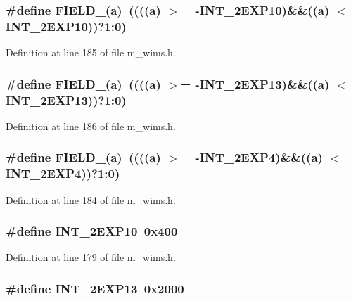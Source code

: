 \subsubsection{\setlength{\rightskip}{0pt plus 5cm}\#define FIELD\_(a)~((((a) $>$= -INT\_\-2EXP10)\&\&((a) $<$ INT\_\-2EXP10))?1:0)}\label{m__wims_8h_3ca7e17ecf6f5e2ca849db42c01b2fa6}




Definition at line 185 of file m\_\-wims.h.
\subsubsection{\setlength{\rightskip}{0pt plus 5cm}\#define FIELD\_(a)~((((a) $>$= -INT\_\-2EXP13)\&\&((a) $<$ INT\_\-2EXP13))?1:0)}\label{m__wims_8h_cc6a0eb7724b0802cbd69ae9acf6082b}




Definition at line 186 of file m\_\-wims.h.
\subsubsection{\setlength{\rightskip}{0pt plus 5cm}\#define FIELD\_(a)~((((a) $>$= -INT\_\-2EXP4)\&\&((a) $<$ INT\_\-2EXP4))?1:0)}\label{m__wims_8h_fccd4f0351ce74077ec3a4453fc78a78}




Definition at line 184 of file m\_\-wims.h.
\subsubsection{\setlength{\rightskip}{0pt plus 5cm}\#define INT\_\-2EXP10~0x400}\label{m__wims_8h_651faa72c9b7f15c045f3331409244fd}




Definition at line 179 of file m\_\-wims.h.
\subsubsection{\setlength{\rightskip}{0pt plus 5cm}\#define INT\_\-2EXP13~0x2000}\label{m__wims_8h_d54f85a1243ada4cb7c81d57efa1e094}




